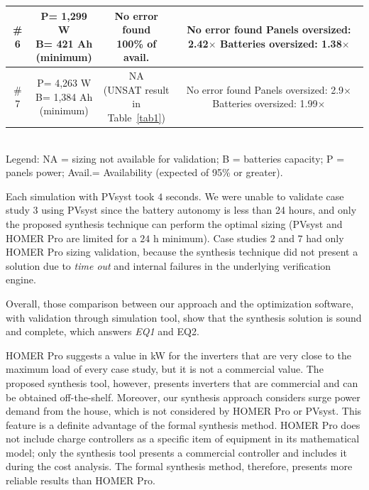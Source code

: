\documentclass[journal]{IEEEtran}
\begin{document}
\begin{table}
\begin{scriptsize}
\begin{tabular}{c|c|c|c}
\hline
\# 6 & \makecell{P= 1,299 W\\B= 421 Ah\\(minimum)}&\makecell{No error found \\100\% of avail.} & \makecell{No error found\\Panels oversized: 2.42$\times$\\Batteries oversized: 1.38$\times$}\\
\hline
\# 7 & \makecell{P= 4,263 W\\B= 1,384 Ah\\(minimum)}&\makecell{NA \\(UNSAT result\\in Table~\ref{tab1})} & \makecell{No error found\\Panels oversized: 2.9$\times$\\Batteries oversized: 1.99$\times$}\\
\hline
\hline
\end{tabular}
\\Legend: NA = sizing not available for validation; B = batteries capacity; P = panels power; Avail.= Availability (expected of 95\% or greater).
\end{scriptsize}
\end{table}

Each simulation with PVsyst took $4$ seconds. We were unable to validate case study $3$ using PVsyst since the battery autonomy is less than 24 hours, and only the proposed synthesis technique can perform the optimal sizing (PVsyst and HOMER Pro are limited for a $24$ h minimum). Case studies $2$ and $7$ had only HOMER Pro sizing validation, because the synthesis technique did not present a solution due to \textit{time out} and internal failures in the underlying verification engine. %

Overall, those comparison between our approach and the optimization software, with validation through simulation tool, show that the synthesis solution is sound and complete, which answers \textit{EQ1} and {EQ2}.

HOMER Pro suggests a value in kW for the inverters that are very close to the maximum load of every case study, but it is not a commercial value. The proposed synthesis tool, however, presents inverters that are commercial and can be obtained off-the-shelf. Moreover, our synthesis approach considers surge power demand from the house, which is not considered by HOMER Pro or PVsyst. This feature is a definite advantage of the formal synthesis method. HOMER Pro does not include charge controllers as a specific item of equipment in its mathematical model; only the synthesis tool presents a commercial controller and includes it during the cost analysis. The formal synthesis method, therefore, presents more reliable results than HOMER Pro.
\end{document}
